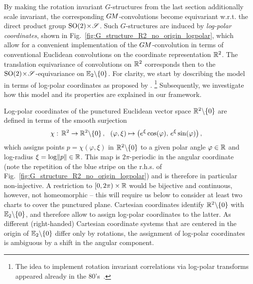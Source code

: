 By making the rotation invariant $G$-structures from the last section additionally scale invariant, the corresponding $G\mkern-1.4muM$-convolutions become equivariant w.r.t. the direct product group ${\operatorname{SO}(2) \!\times\! \mathscr{S}}$.
Such $G$-structures are induced by \emph{log-polar coordinates}, shown in Fig.~\ref{fig:G_structure_R2_no_origin_logpolar}, which allow for a convenient implementation of the $G\mkern-1.4muM$-convolution in terms of conventional Euclidean convolutions on the coordinate representation $\mathbb{R}^2$.
The translation equivariance of convolutions on $\mathbb{R}^2$ corresponds then to the ${\operatorname{SO}(2) \!\times\! \mathscr{S}}$-equivariance on $\mathbb{E}_2 \backslash \{0\}$.
For clarity, we start by describing the model in terms of log-polar coordinates as proposed by \citet{esteves2017polar}.%
\footnote{
    The idea to implement rotation invariant correlations via log-polar transforms appeared already in the 80's~\cite{saito1983scale,casasent1987real}.
}
Subsequently, we investigate how this model and its properties are explained in our framework.


Log-polar coordinates of the punctured Euclidean vector space $\mathbb{R}^2 \backslash \{0\}$ are defined in terms of the smooth surjection
\begin{align}
    \chi:\, \R^2 \to \R^2 \backslash \{0\} \,,\ \ 
    (\varphi, \xi) \mapsto \big( e^\xi \cos(\varphi) ,\, e^\xi \sin(\varphi) \big) \,,
\end{align}
which assigns points $p = \chi(\varphi,\xi)$ in $\mathbb{R}^2 \backslash \{0\}$ to a given polar angle $\varphi \in \mathbb{R}$ and log-radius ${\xi = \log\lVert p\rVert \in \mathbb{R}}$.
This map is $2\pi$-periodic in the angular coordinate (note the repetition of the blue stripe on the r.h.s. of Fig.~\ref{fig:G_structure_R2_no_origin_logpolar}) and is therefore in particular non-injective.
A restriction to $[0,2\pi) \times \mathbb{R}$ would be bijective and continuous, however, not homeomorphic -- this will require us below to consider at least two charts to cover the punctured plane.
Cartesian coordinates identify $\mathbb{R}^2 \backslash \{0\}$ with $\mathbb{E}_2 \backslash \{0\}$, and therefore allow to assign log-polar coordinates to the latter.
As different (right-handed) Cartesian coordinate systems that are centered in the origin of $\mathbb{E}_2 \backslash \{0\}$ differ only by rotations, the assignment of log-polar coordinates is ambiguous by a shift in the angular component.


